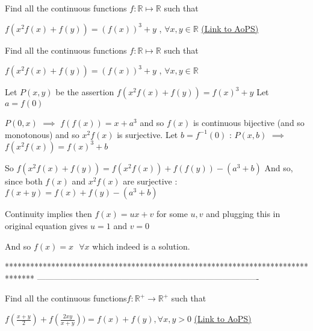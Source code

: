 \begin{problem}
	Find all the continuous functions $f : \mathbb{R} \mapsto\mathbb{R}$ such that  

 $  f(x^{2}f\left ( x \right )+f\left ( y \right ))=\left ( f\left ( x \right ) \right )^{3}+y $                                                                                                     , $\forall x,y \in \mathbb{R}$
	\flushright \href{https://artofproblemsolving.com/community/c6h618473}{(Link to AoPS)}
\end{problem}



\begin{solution}
	\begin{tcolorbox}Find all the continuous functions $f : \mathbb{R} \mapsto\mathbb{R}$ such that  

 $  f(x^{2}f\left ( x \right )+f\left ( y \right ))=\left ( f\left ( x \right ) \right )^{3}+y $                                                                                                     , $\forall x,y \in \mathbb{R}$\end{tcolorbox}
Let $P(x,y)$ be the assertion $f(x^2f(x)+f(y))=f(x)^3+y$
Let $a=f(0)$

$P(0,x)$ $\implies$ $f(f(x))=x+a^3$ and so $f(x)$ is continuous bijective (and so monotonous) and so $x^2f(x)$ is surjective.
Let $b=f^{-1}(0)$ : $P(x,b)$ $\implies$ $f(x^2f(x))=f(x)^3+b$

So $f(x^2f(x)+f(y))=f(x^2f(x))+f(f(y))-(a^3+b)$ And so, since both $f(x)$ and $x^2f(x)$ are surjective : $f(x+y)=f(x)+f(y)-(a^3+b)$

Continuity implies then $f(x)=ux+v$ for some $u,v$ and plugging this in original equation gives $u=1$ and $v=0$

And so $\boxed{f(x)=x\text{  }\forall x}$ which indeed is a solution.
\end{solution}
*******************************************************************************
-------------------------------------------------------------------------------

\begin{problem}
	Find all the continuous functions$ f:\mathbb{R}^{+}\rightarrow \mathbb{R}^{+}$ such  that

$f\left ( \frac{x+y}{2} \right )+f\left ( \frac{2xy}{x+y} \right ) )=f(x)+f(y),\forall x,y> 0$
	\flushright \href{https://artofproblemsolving.com/community/c6h618477}{(Link to AoPS)}
\end{problem}



